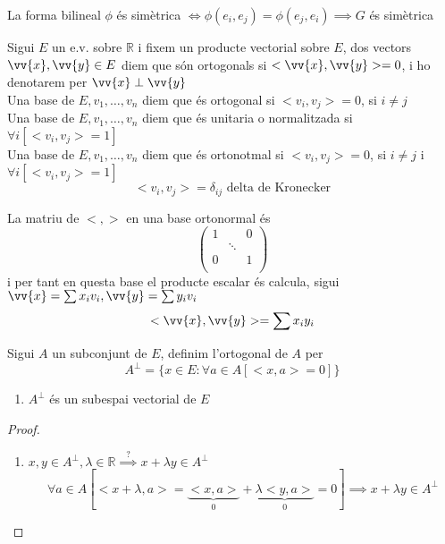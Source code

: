 \begin{prop}
	La forma bilineal $\phi$ és simètrica $\iff\phi(e_i,e_j)=\phi(e_j,e_i)\implies G$ és simètrica
\end{prop}

\begin{defn}
	Sigui $E$ un e.v. sobre $\mathbb{R}$ i fixem un producte vectorial sobre $E$, dos vectors $\vv{x},\vv{y}\in E$ diem que són ortogonals si $<\vv{x},\vv{y}>=0$, i ho denotarem per $\vv{x}\perp\vv{y}$ \\
	Una base de $E,v_1,\dotsc,v_n$ diem que és ortogonal si $<v_i,v_j>=0$, si $i\neq j$ \\
	Una base de $E,v_1,\dotsc,v_n$ diem que és unitaria o normalitzada si $\forall i[<v_i,v_j>=1]$ \\
	Una base de $E,v_1,\dotsc,v_n$ diem que és ortonotmal si $<v_i,v_j>=0$, si $i\neq j$ i $\forall i[<v_i,v_j>=1]$ 
	\[<v_i,v_j>=\delta_{ij}\text{ delta de Kronecker}\]
\end{defn}

\begin{prop}
	La matriu de $<,>$ en una base ortonormal és
	\[\left(\begin{array}{ccc}
		1&&0\\
		&\ddots&\\
		0&&1\\	
	\end{array}\right)\]
	i per tant en questa base el producte escalar és calcula, sigui $\vv{x}=\sum x_iv_i,\vv{y}=\sum y_iv_i$
	\[<\vv{x},\vv{y}>=\sum x_iy_i\]
\end{prop}

\begin{defn}
	Sigui $A$ un subconjunt de $E$, definim l'ortogonal de $A$ per
	\[A^\perp=\{x\in E:\forall a\in A[<x,a>=0]\}\]
\end{defn}

\begin{prop}\begin{enumerate}
	\item $A^\perp$ és un subespai vectorial de $E$
\end{enumerate}\end{prop}
\begin{proof}\begin{enumerate}
	\item $x,y\in A^\perp,\lambda\in\mathbb{R}\mathop{\implies}\limits^{?}x+\lambda y\in A^\perp$ \\
	\[\forall a\in A[<x+\lambda,a>=\underbrace{<x,a>}_{0}+\underbrace{\lambda<y,a>}_{0}=0]\implies x+\lambda y\in A^\perp\]
\end{enumerate}\end{proof}
